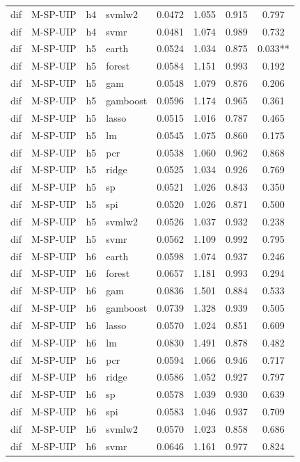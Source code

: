 \begin{ThreePartTable}
\begin{longtable}[t]{llclcccc}
dif & M-SP-UIP & h4 & svmlw2 & 0.0472 & 1.055 & 0.915 & 0.797\\
dif & M-SP-UIP & h4 & svmr & 0.0481 & 1.074 & 0.989 & 0.732\\
\addlinespace
dif & M-SP-UIP & h5 & earth & 0.0524 & 1.034 & 0.875 & 0.033**\\
dif & M-SP-UIP & h5 & forest & 0.0584 & 1.151 & 0.993 & 0.192\\
dif & M-SP-UIP & h5 & gam & 0.0548 & 1.079 & 0.876 & 0.206\\
dif & M-SP-UIP & h5 & gamboost & 0.0596 & 1.174 & 0.965 & 0.361\\
dif & M-SP-UIP & h5 & lasso & 0.0515 & 1.016 & 0.787 & 0.465\\
dif & M-SP-UIP & h5 & lm & 0.0545 & 1.075 & 0.860 & 0.175\\
dif & M-SP-UIP & h5 & pcr & 0.0538 & 1.060 & 0.962 & 0.868\\
dif & M-SP-UIP & h5 & ridge & 0.0525 & 1.034 & 0.926 & 0.769\\
dif & M-SP-UIP & h5 & sp & 0.0521 & 1.026 & 0.843 & 0.350\\
dif & M-SP-UIP & h5 & spi & 0.0520 & 1.026 & 0.871 & 0.500\\
dif & M-SP-UIP & h5 & svmlw2 & 0.0526 & 1.037 & 0.932 & 0.238\\
dif & M-SP-UIP & h5 & svmr & 0.0562 & 1.109 & 0.992 & 0.795\\
\addlinespace
dif & M-SP-UIP & h6 & earth & 0.0598 & 1.074 & 0.937 & 0.246\\
dif & M-SP-UIP & h6 & forest & 0.0657 & 1.181 & 0.993 & 0.294\\
dif & M-SP-UIP & h6 & gam & 0.0836 & 1.501 & 0.884 & 0.533\\
dif & M-SP-UIP & h6 & gamboost & 0.0739 & 1.328 & 0.939 & 0.505\\
dif & M-SP-UIP & h6 & lasso & 0.0570 & 1.024 & 0.851 & 0.609\\
dif & M-SP-UIP & h6 & lm & 0.0830 & 1.491 & 0.878 & 0.482\\
dif & M-SP-UIP & h6 & pcr & 0.0594 & 1.066 & 0.946 & 0.717\\
dif & M-SP-UIP & h6 & ridge & 0.0586 & 1.052 & 0.927 & 0.797\\
dif & M-SP-UIP & h6 & sp & 0.0578 & 1.039 & 0.930 & 0.639\\
dif & M-SP-UIP & h6 & spi & 0.0583 & 1.046 & 0.937 & 0.709\\
dif & M-SP-UIP & h6 & svmlw2 & 0.0570 & 1.023 & 0.858 & 0.686\\
dif & M-SP-UIP & h6 & svmr & 0.0646 & 1.161 & 0.977 & 0.824\\

\end{longtable}
\end{ThreePartTable}
